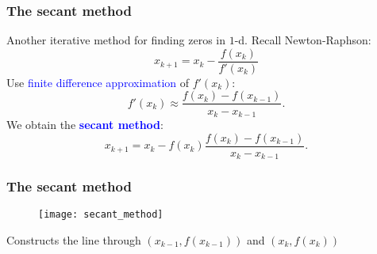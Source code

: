 \documentclass{beamer}
\begin{document}
\begin{frame}
  \frametitle{The secant method}
  Another iterative method for finding zeros in $1$-d.
  Recall Newton-Raphson:
  \begin{equation}
    x_{k+1} = x_k - \frac{f(x_k)}{f'(x_k)}
  \end{equation}
  Use \textcolor{blue}{finite difference approximation} of $f'(x_k)$:
  \begin{equation}
    f'(x_k) \approx \frac{f(x_k) - f(x_{k-1})}{x_k - x_{k-1}}.
  \end{equation}
  We obtain the \textcolor{blue}{\textbf{secant method}}:
  \begin{equation}
    x_{k+1} = x_k - f(x_k) \frac{f(x_k) - f(x_{k-1})}{x_k - x_{k-1}}.
  \end{equation}

\end{frame}


\begin{frame}
  \frametitle{The secant method}
  \begin{figure}[ht]
    \centering
    \texttt{[image: secant\_method]}
  \end{figure}
  Constructs the line through $(x_{k-1}, f(x_{k-1}))$ and $(x_k, f(x_k))$
\end{frame}

\begin{frame}
  \frametitle{}

\end{frame}
\end{document}
